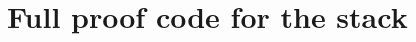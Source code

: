 \documentclass[sigplan,screen]{acmart}
\begin{document}




\appendix

\section{Full proof code for the stack}
\end{document}
